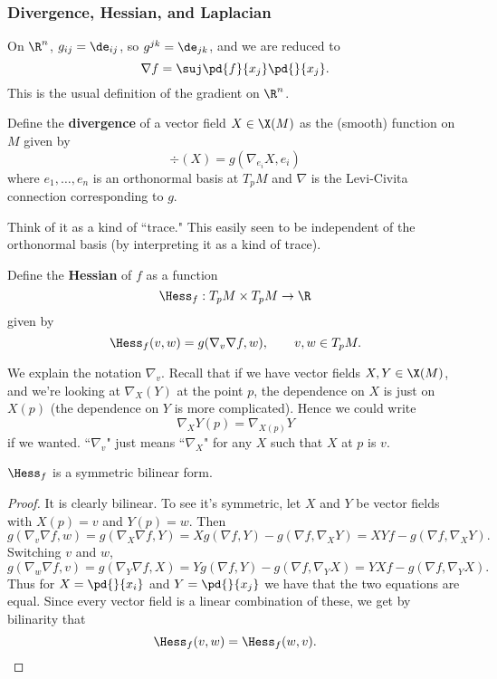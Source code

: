\subsubsection{Divergence, Hessian, and Laplacian}

\begin{ex}
On $\R^n$, $g_{ij}=\de_{ij}$, so $g^{jk}=\de_{jk}$, and we are reduced to \[\nabla f=\suj\pd{f}{x_j}\pd{}{x_j}.\]
This is the usual definition of the gradient on $\R^n$.
\end{ex}

\begin{df}
Define the \textbf{divergence} of a vector field $X\in \X(M)$ as the (smooth) function on $M$ given by
\[
\div(X)=g(\nabla_{e_i} X,e_i)
\]
where $e_1,\ldots, e_n$ is an orthonormal basis at $T_pM$ and $\nabla$ is the Levi-Civita connection corresponding to $g$.
\end{df}
Think of it as a kind of ``trace." This easily seen to be independent of the orthonormal basis (by interpreting it as a kind of trace).

\begin{df}
Define the \textbf{Hessian} of $f$ as a function
\[
\Hess_f:T_pM\times T_pM\to \R
\]
given by
\[
\Hess_f(v,w)=g(\nabla_v\nabla f,w),\qquad v,w\in T_pM.
\]
\end{df}
We explain the notation $\nabla_v$. 
Recall that if we have vector fields $X,Y\in \X(M)$, and we're looking at $\nabla_X(Y)$ at the point $p$, the dependence on $X$ is just on $X(p)$ (the dependence on $Y$ is more complicated). Hence we could write
\[
\nabla_XY(p)=\nabla_{X(p)}Y
\]
if we wanted. ``$\nabla_v$" just means ``$\nabla_X$" for any $X$ such that $X$ at $p$ is $v$.

\begin{pr}
$\Hess_f$ is a symmetric bilinear form.
\end{pr}
\begin{proof}
It is clearly bilinear. To see it's symmetric, let $X$ and $Y$ be vector fields with $X(p)=v$ and $Y(p)=w$. Then 
\[
g(\nabla_v\nabla f,w)=g(\nabla_X\nabla f,Y)=Xg(\nabla f,Y)-g(\nabla f,\nabla_XY)=XYf-g(\nabla f,\nabla_XY).
\]
Switching $v$ and $w$,
\[
g(\nabla_w\nabla f,v)=g(\nabla_Y\nabla f,X)=Yg(\nabla f,Y)-g(\nabla f,\nabla_YX)=YXf-g(\nabla f,\nabla_YX).
\]
Thus for $X=\pd{}{x_i}$ and $Y=\pd{}{x_j}$ we have that the two equations are equal. Since every vector field is a linear combination of these, we get by bilinarity that
\[
\Hess_f(v,w)=\Hess_f(w,v).
\]
\end{proof}

